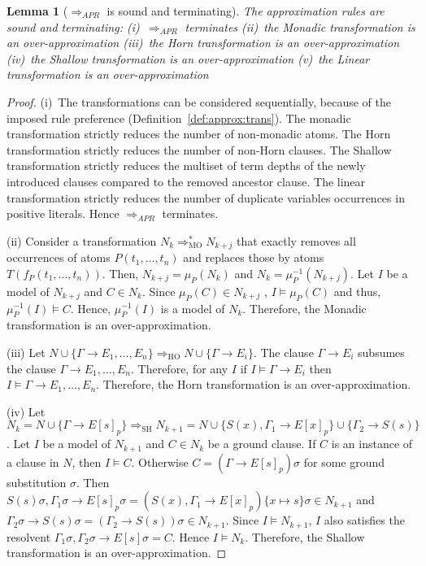 \documentclass{llncs}
\newcommand{\sat}{\vDash}
\newcommand{\imp}{\rightarrow}
\newcommand{\R}[1]{\mu^{-1}_{#1}}
\newcommand{\Proj}[1]{\mu_{#1}}
\newcommand{\apr}{ \Rightarrow_{APR}}
\newtheorem{lem}[theorem]{Lemma}
\begin{document}
\begin{lem}[$\apr$ is sound and terminating]\label{Apr_sound}
The approximation rules are sound and terminating:
(i)~$\apr$  terminates
(ii)~the Monadic transformation is an over-approximation
(iii)~the Horn transformation is an over-approximation
(iv)~the Shallow transformation is an over-approximation
(v)~the Linear transformation is an over-approximation
\end{lem}
\begin{proof}
(i)~The transformations can be considered sequentially, because of the imposed rule preference (Definition~\ref{def:approx:trans}). 
The monadic transformation strictly reduces the number of non-monadic atoms.
The Horn transformation strictly reduces the number of non-Horn clauses.
The Shallow transformation strictly reduces the multiset of term depths of the newly introduced clauses compared
to the removed ancestor clause.
The linear transformation strictly reduces the number of duplicate variables occurrences in positive literals. 
Hence $\apr$  terminates.

(ii) Consider a transformation $N_k\Rightarrow^*_{\text{MO}} N_{k+j}$ that exactly removes all occurrences of atoms $P(t_1,\dots,t_n)$ and
replaces those by atoms $T(f_P(t_1,\dots,t_n))$.
Then, $N_{k+j}=\Proj{P}(N_k) $ and $N_k=\R{P}(N_{k+j}) $.
Let $I$ be a model of $N_{k+j}$ and $C \in N_{k}$.  
Since $ \Proj{P}(C) \in N_{k+j}$ , $I \sat \Proj{P}(C)$ and thus, $\R{P}(I)\sat C$.
Hence, $\R{P}(I)$ is a  model of $N_k$.
Therefore, the Monadic transformation is an over-approximation.

(iii) Let $N\cup\{\Gamma \imp E_1, \dots,E_n\} \Rightarrow_{\text{HO}} N\cup\{\Gamma \imp E_i\}$.
The clause $\Gamma \imp E_i$ subsumes the clause $\Gamma \imp E_1, \dots,E_n$. Therefore, for any $I$
if $I\models \Gamma \imp E_i$  then $I\models \Gamma \imp E_1, \dots,E_n$.
Therefore, the Horn transformation is an over-approximation.

(iv) Let $N_k = N\cup\{\Gamma \imp E[s]_{p}\} \Rightarrow_{\text{SH}} N_{k+1}= N\cup\{S(x),\Gamma_1 \imp E[x]_{p}\}\cup\{ \Gamma_2 \imp S(s)\}$.
Let $I$ be a model of $N_{k+1}$ and $C\in N_k$ be a ground clause. 
If $C$ is an instance of a clause in $N$, then $I \models C$.
Otherwise $C = (\Gamma \imp E[s]_{p})\sigma$ for some ground substitution $\sigma$.
Then $S(s)\sigma,\Gamma_1\sigma \imp E[s]_{p}\sigma = (S(x),\Gamma_1 \imp E[x]_{p})\{x \mapsto s\}\sigma \in N_{k+1}$ 
and $ \Gamma_2\sigma \imp S(s)\sigma = (\Gamma_2 \imp S(s))\sigma \in N_{k+1}$.
Since $I \models N_{k+1} $, $I$ also satisfies the resolvent $\Gamma_1\sigma,\Gamma_2\sigma \imp E[s]\sigma = C$. 
Hence $I \models N_k$.
Therefore, the Shallow transformation is an over-approximation.


\end{proof}
\end{document}
